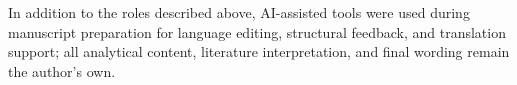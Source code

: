 In addition to the roles described above, AI-assisted tools were used
during manuscript preparation for language editing, structural feedback,
and translation support; all analytical content, literature
interpretation, and final wording remain the author's own.



